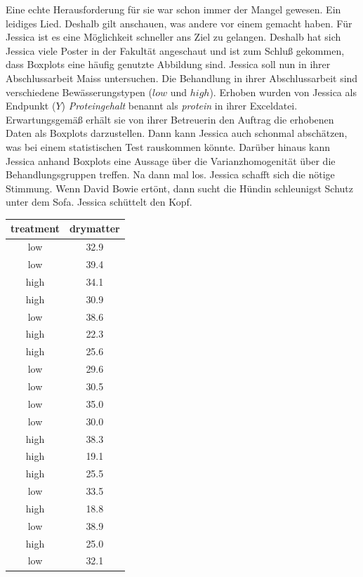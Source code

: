 \documentclass[a4paper, 9pt]{scrartcl}\usepackage[]{graphicx}\usepackage[]{xcolor}
\begin{document}
Eine echte Herausforderung für sie war schon immer der Mangel gewesen. Ein leidiges Lied. Deshalb gilt anschauen, was andere vor einem gemacht haben. Für Jessica ist es eine Möglichkeit schneller ans Ziel zu gelangen. Deshalb hat sich Jessica viele Poster in der Fakultät angeschaut und ist zum Schluß gekommen, dass Boxplots eine häufig genutzte Abbildung sind. Jessica soll nun in ihrer Abschlussarbeit Maiss untersuchen. Die Behandlung in ihrer Abschlussarbeit sind verschiedene Bewässerungstypen ($low$ und $high$). Erhoben wurden von Jessica als Endpunkt ($Y$) \textit{Proteingehalt} benannt als \textit{protein} in ihrer Exceldatei. Erwartungsgemäß erhält sie von ihrer Betreuerin den Auftrag die erhobenen Daten als Boxplots darzustellen. Dann kann Jessica auch schonmal abschätzen, was bei einem statistischen Test rauskommen könnte. Darüber hinaus kann Jessica anhand Boxplots eine Aussage über die Varianzhomogenität über die Behandlungsgruppen treffen. Na dann mal los. Jessica schafft sich die nötige Stimmung. Wenn David Bowie ertönt, dann sucht die Hündin schleunigst Schutz unter dem Sofa. Jessica schüttelt den Kopf.

\begin{table}[!h]
\centering
\begin{tabular}{cc}
\toprule
treatment & drymatter\\
\midrule
low & 32.9\\
low & 39.4\\
high & 34.1\\
high & 30.9\\
low & 38.6\\
\addlinespace
high & 22.3\\
high & 25.6\\
low & 29.6\\
low & 30.5\\
low & 35.0\\
\addlinespace
low & 30.0\\
high & 38.3\\
high & 19.1\\
high & 25.5\\
low & 33.5\\
\addlinespace
high & 18.8\\
low & 38.9\\
high & 25.0\\
low & 32.1\\
\bottomrule
\end{tabular}
\end{table}
\end{document}
